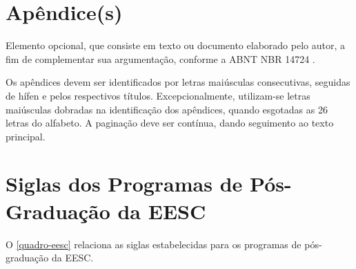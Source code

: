 
\begin{apendicesenv}
\partapendices
\chapter{Apêndice(s)}
Elemento opcional, que consiste em texto ou documento elaborado pelo autor, a fim de complementar sua argumentação, conforme a ABNT NBR 14724 \cite{nbr14724}.

Os apêndices devem ser identificados por letras maiúsculas consecutivas, seguidas de hífen e pelos respectivos títulos. Excepcionalmente, utilizam-se letras maiúsculas dobradas na identificação dos apêndices, quando esgotadas as 26 letras do alfabeto. A paginação deve ser contínua, dando seguimento ao texto principal. \cite{sibi2009}

\chapter{Siglas dos Programas de Pós-Graduação da EESC}
O \autoref{quadro-eesc} relaciona as siglas estabelecidas para os programas de pós-graduação da EESC.


\end{apendicesenv}
